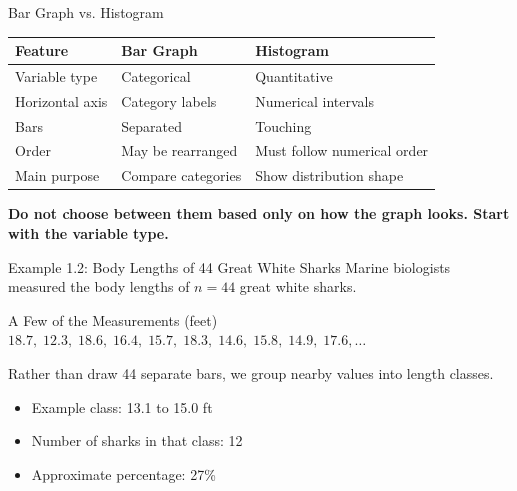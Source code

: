 \documentclass[aspectratio=169]{beamer}
\begin{document}
\begin{frame}{Bar Graph vs. Histogram}
  \begin{table}
    \centering
    \begin{tabular}{lll}
      \toprule
      \textbf{Feature} & \textbf{Bar Graph} & \textbf{Histogram} \\
      \midrule
      Variable type & Categorical & Quantitative \\
      Horizontal axis & Category labels & Numerical intervals \\
      Bars & Separated & Touching \\
      Order & May be rearranged & Must follow numerical order \\
      Main purpose & Compare categories & Show distribution shape \\
      \bottomrule
    \end{tabular}
  \end{table}
  \vspace{0.2cm}
  \centering
  \textbf{Do not choose between them based only on how the graph looks. Start with the variable type.}
\end{frame}

\begin{frame}{Example 1.2: Body Lengths of 44 Great White Sharks}
  Marine biologists measured the body lengths of $n=44$ great white sharks.
  \vspace{0.15cm}
  \begin{block}{A Few of the Measurements (feet)}
    \centering
    $18.7,\;12.3,\;18.6,\;16.4,\;15.7,\;18.3,\;14.6,\;15.8,\;14.9,\;17.6,\ldots$
  \end{block}
  \vspace{0.15cm}
  Rather than draw 44 separate bars, we group nearby values into length classes.
  \begin{itemize}
    \item Example class: 13.1 to 15.0 ft
    \item Number of sharks in that class: 12
    \item Approximate percentage: 27\%
  \end{itemize}
\end{frame}
\end{document}
